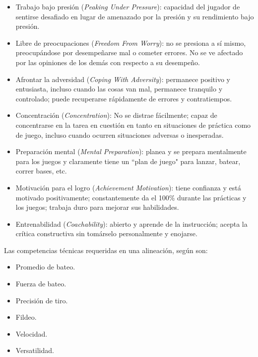 \begin{itemize}
	\item Trabajo bajo presión (\textit{Peaking Under Pressure}): capacidad del jugador de sentirse desafiado en lugar de amenazado por la presión y su rendimiento bajo presión.
	
	\item Libre de preocupaciones (\textit{Freedom From Worry}): no se presiona a sí mismo, preocupándose por desempeñarse mal o cometer errores. No se ve afectado por las opiniones de los demás con respecto a su desempeño.
	
	\item Afrontar la adversidad (\textit{Coping With Adversity}): permanece positivo y entusiasta, incluso cuando las cosas van mal, permanece tranquilo y controlado; puede recuperarse rápidamente de errores y contratiempos.
	
	\item Concentración (\textit{Concentration}): No se distrae fácilmente; capaz de concentrarse en la tarea en cuestión en tanto en situaciones de práctica como de juego, incluso cuando ocurren situaciones adversas o inesperadas.
	
	\item Preparación mental (\textit{Mental Preparation}): planea y se prepara mentalmente para los juegos y claramente tiene un “plan de juego" para lanzar, batear, correr bases, etc.
	
	\item Motivación para el logro (\textit{Achievement Motivation}): tiene confianza y está motivado positivamente; constantemente da el 100\% durante las prácticas y los juegos; trabaja duro para mejorar sus habilidades.
	
	\item Entrenabilidad (\textit{Coachability}): abierto y aprende de la instrucción; acepta la crítica constructiva sin tomárselo personalmente y enojarse.
\end{itemize}

Las competencias técnicas requeridas en una alineación, según \cite{2020a, Silverman2011} son:
\begin{itemize}
	\item Promedio de bateo.
	\item Fuerza de bateo.
	\item Precisión de tiro. 
	\item Fildeo.
	\item Velocidad.
	\item Versatilidad.
\end{itemize}

